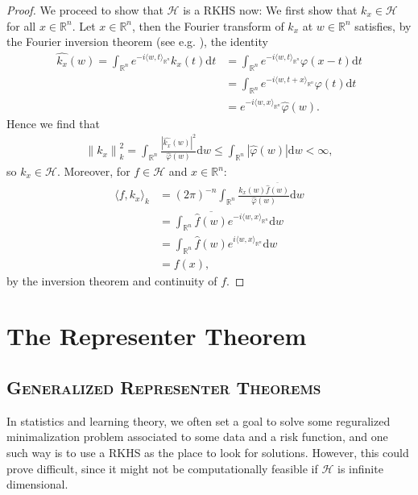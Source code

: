 \documentclass[10pt,twoside,openany,final]{memoir}
\newcommand{\sssection}[1]{%
\section[#1]{\centering\normalfont\scshape \textbf{#1}}}
\theoremstyle{definition}
\theoremstyle{Break}
\newcommand{\lv}{\left\lVert}
\newcommand{\rv}{\right\rVert}
\newcommand{\R}{\mathbb{R}}
\renewcommand{\H}{\mathcal{H}}
\renewcommand{\d}{\mathrm{d}}
\begin{document}
\begin{proof}
	We proceed to show that $\H$ is a RKHS now: We first show that $k_x \in \H$ for all $x \in \R^n$. Let $x \in \R^n$, then the Fourier transform of $k_x$ at $w \in \R^n$ satisfies, by the Fourier inversion theorem (see e.g. \cite{ACIAHA}), the identity
\begin{align*}
	\widehat{k_x}(w) =  \int_{\R^n} e^{-i\langle w,t\rangle_{\R^n}} k_x(t) \d t  &=  \int_{\R^n} e^{-i \langle w,t \rangle_{\R^n}}\varphi(x-t) \d t\\
	&= \int_{\R^n}e^{-i \langle w, t+x \rangle_{\R^n}} \varphi(t) \d t\\
	&= e^{-i\langle w,x \rangle_{\R^n}} \hat{\varphi}(w).
\end{align*}
Hence we find that 
\begin{align*}
	\lv k_x \rv_{k}^2 = \int_{\R^n} \frac{|\widehat{k_x}(w)|^2}{\hat{\varphi}(w)} \d w \leq \int_{\R^n} | \hat{\varphi}(w) | \d w < \infty,
\end{align*}
so $k_x \in \H$. Moreover, for $f \in \H$ and $x \in \R^n$:
\begin{align*}
	\langle f , k_x \rangle_{k} &=(2 \pi)^{-n} \int_{\R^n} \frac{\widehat{k_x}(w) \overline{\widehat{f}(w)}}{\widehat{\varphi}(w)} \d w\\ &= \int_{\R^n} \overline{\widehat{f}(w)}e^{-i \langle w,x\rangle_{\R^n}} \d w \\
	&= \int _{\R^n} \widehat f(w) e^{i \langle w, x \rangle_{\R^n}} \d w\\
	&= f(x),
\end{align*}
by the inversion theorem and continuity of $f$.
\end{proof}
\chapter{The Representer Theorem}

\sssection{Generalized Representer Theorems}

In statistics and learning theory, we often set a goal to solve some reguralized minimalization problem associated to some data and a risk function, and one such way is to use a RKHS as the place to look for solutions. However, this could prove difficult, since it might not be computationally feasible if $\H$ is infinite dimensional. 
\end{document}

